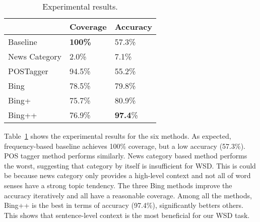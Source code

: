 \begin{CJK}{UTF8}{gbsn}
\begin{table}[ht]
\centering
  \caption{Experimental results.}
  \label{table:evaluation_1}
  \begin{tabular}{| p{2.5cm} | p{1.8cm} | p{1.8cm} |}
    \hline
     & Coverage & Accuracy\\
    \hline
    Baseline & {\bf 100\%} & 57.3\%\\
    \hline
    News Category & 2.0\% & 7.1\%\\
    \hline
    POSTagger & 94.5\% & 55.2\%\\
        \hline
    Bing & 78.5\% & 79.8\%\\
    \hline
    Bing+ & 75.7\% & 80.9\%\\
    \hline
    Bing++ & 76.9\% & {\bf 97.4}\%\\
    \hline
  \end{tabular}
\end{table}

Table~\ref{table:evaluation_1} shows the experimental results for the six methods.
As expected, frequency-based baseline achieves 100\% coverage, but a low accuracy (57.3\%). POS tagger method performs similarly. News category based method performs the worst, suggesting that category by itself is insufficient for WSD. This is could be because news category only provides a high-level context and  not all of word senses have a strong topic tendency. 
The three Bing methods improve the accuracy iteratively and all have a reasonable coverage. Among all the methods, Bing++ is the best in terms of accuracy (97.4\%), significantly betters others. This shows that  sentence-level context is the most beneficial for our WSD task.




\end{CJK}

